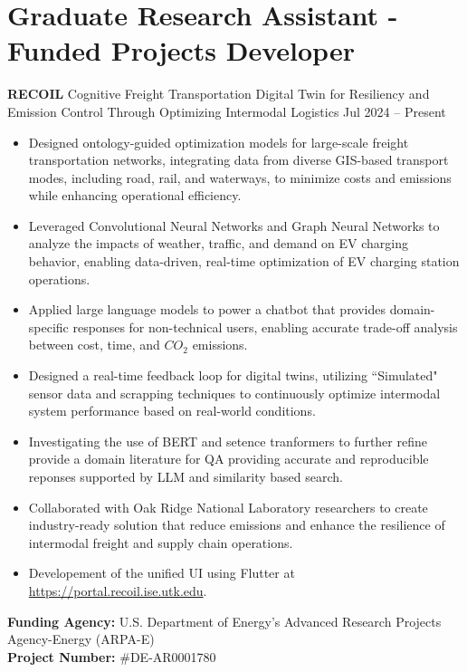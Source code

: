 \documentclass[10pt, letterpaper]{article}
\newenvironment{highlights}{
    \begin{itemize}[
        topsep=0.10 cm,
        parsep=0.10 cm,
        partopsep=0pt,
        itemsep=0pt,
        leftmargin=0 cm + 10pt
    ]
}{
    \end{itemize}
} %
\newenvironment{twocolentry}[2][]{
    \onecolentry
    \def\secondColumn{#2}
    \setcolumnwidth{\fill, 4.5 cm}
    \begin{paracol}{2}
}{
    \switchcolumn \raggedleft \secondColumn
    \end{paracol}
    \endonecolentry
} %
\begin{document}
        \vspace{0.3cm} 




    \section*{Graduate Research Assistant - Funded Projects Developer}
    \small
    \begin{twocolentry}{Jul 2024 – Present} \textbf{RECOIL} \textbar Cognitive Freight Transportation Digital Twin for Resiliency and Emission Control Through Optimizing Intermodal Logistics \end{twocolentry} \begin{highlights} 
        \item Designed ontology-guided optimization models for large-scale freight transportation networks, integrating data from diverse GIS-based transport modes, including road, rail, and waterways, to minimize costs and emissions while enhancing operational efficiency. 
        \item Leveraged Convolutional Neural Networks and Graph Neural Networks to analyze the impacts of weather, traffic, and demand on EV charging behavior, enabling data-driven, real-time optimization of EV charging station operations. 
        \item Applied large language models to power a chatbot that provides domain-specific responses for non-technical users, enabling accurate trade-off analysis between cost, time, and $CO_2$ emissions.
        \item Designed a real-time feedback loop for digital twins, utilizing ``Simulated" sensor data and scrapping techniques to continuously optimize intermodal system performance based on real-world conditions.
        \item Investigating the use of BERT and setence tranformers to further refine provide a domain literature for QA providing accurate and reproducible reponses supported by LLM and similarity based search.
        \item Collaborated with Oak Ridge National Laboratory researchers to create industry-ready solution that reduce emissions and enhance the resilience of intermodal freight and supply chain operations.
        \item Developement of the unified UI using Flutter at \url{https://portal.recoil.ise.utk.edu}.
        
        \end{highlights} \vspace{0.3cm} \noindent \textbf{Funding Agency:} U.S. Department of Energy’s Advanced Research Projects Agency-Energy (ARPA-E)\\  \textbf{Project Number:} \#DE-AR0001780
\end{document}
